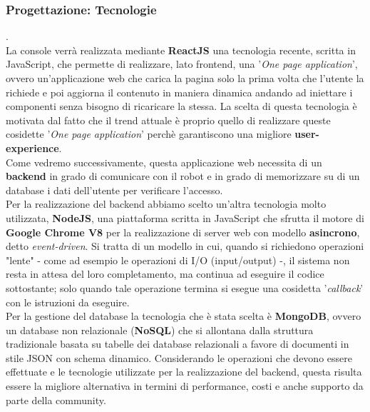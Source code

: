 \documentclass{llncs}
\begin{document}
\subsubsection{Progettazione: Tecnologie} .
\label{ProgettazioneReq1Tec}
\vspace*{1ex}
\\
La console verr\`a realizzata mediante \textbf{ReactJS} una tecnologia recente, scritta in JavaScript, che permette di realizzare, lato frontend, una '\textit{One page application}', ovvero un'applicazione web che carica la pagina solo la prima volta che l'utente la richiede e poi aggiorna il contenuto in maniera dinamica andando ad iniettare i componenti senza bisogno di ricaricare la stessa. La scelta di questa tecnologia \`e motivata dal fatto che il trend attuale \`e proprio quello di realizzare queste cosidette '\textit{One page application}' perch\`e garantiscono una migliore \textbf{user-experience}.\\
Come vedremo successivamente, questa applicazione web necessita di un \textbf{backend} in grado di comunicare con il robot e in grado di memorizzare su di un database i dati dell'utente per verificare l'accesso.\\
Per la realizzazione del backend abbiamo scelto un'altra tecnologia molto utilizzata, \textbf{NodeJS}, una piattaforma scritta in JavaScript che sfrutta il motore di \textbf{Google Chrome V8} per la realizzazione di server web con modello \textbf{asincrono}, detto \textit{event-driven}. Si tratta di un modello in cui, quando si richiedono operazioni "lente"  - come ad esempio le operazioni di I/O (input/output) -, il sistema non resta in attesa del loro completamento, ma continua ad eseguire il codice sottostante;  solo quando tale operazione termina si esegue una cosidetta '\textit{callback}' con le istruzioni da eseguire.\\
Per la gestione del database la tecnologia che \`e stata scelta \`e \textbf{MongoDB}, ovvero un database non relazionale (\textbf{NoSQL}) che  si allontana dalla struttura tradizionale basata su tabelle dei database relazionali a favore di documenti in stile JSON con schema dinamico. Considerando le operazioni che devono essere effettuate e le tecnologie utilizzate per la realizzazione del backend, questa risulta essere la migliore alternativa in termini di performance, costi e anche supporto da parte della community.
\pagebreak

\end{document}
